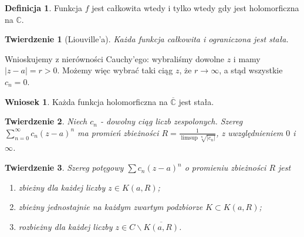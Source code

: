 \documentclass[11pt]{article}
\newcommand{\abs}[1]{\left|#1\right|} %
\newcommand{\closure}[1]{\overline{#1}} %
\newcommand{\extcomplex}{\overline{\mathbb{C}}} %
\theoremstyle{plain}
\newtheorem*{theorem}{Twierdzenie}
\theoremstyle{definition}
\newtheorem*{definition}{Definicja}
\newtheorem*{corollary}{Wniosek}
\theoremstyle{remark}
\let\oldendproof\endproof
\renewenvironment{proof}[1][\proofname]{
  \oldproof[\textsc{\small #1}]
}{\oldendproof}
\begin{document}
\begin{definition}
  Funkcja $ f $ jest całkowita wtedy i tylko wtedy gdy jest holomorficzna na $ \mathbb{C} $.
\end{definition}

\begin{theorem}[Liouville'a]
  Każda funkcja całkowita i ograniczona jest stała.
\end{theorem}

\begin{proof}
  Wnioskujemy z nierówności Cauchy'ego: wybraliśmy dowolne $ z $ i mamy $ \abs{z-a} = r > 0 $. Możemy więc wybrać taki ciąg $ z $, że $ r \to \infty $, a stąd wszystkie $ c_{n} = 0 $. 
\end{proof}

\begin{corollary}
  Każda funkcja holomorficzna na $ \extcomplex $ jest stała.
\end{corollary}

\begin{theorem}
  Niech $ c_{n} $ - dowolny ciąg liczb zespolonych. Szereg $ \sum_{n=0}^{\infty} c_{n}(z-a)^{n} $ ma promień zbieżności $ R = \frac{1}{\limsup \sqrt[n]{\abs{c_{n}}}} $, z uwzględnieniem $ 0 $ i $ \infty $.
\end{theorem}

\begin{theorem}
  Szereg potęgowy $ \sum c_{n}(z-a)^{n} $ o promieniu zbieżności $ R $ jest 
  \begin{enumerate}
    \item zbieżny dla każdej liczby $ z \in K(a, R) $; \label{prom-zbieznosci-zbieznosc}
    \item zbieżny jednostajnie na każdym zwartym podzbiorze $ K \subset K(a, R) $; \label{prom-zbieznosci-zbieznosc-jedn}
    \item rozbieżny dla każdej liczby $ z \in C \backslash \closure{K(a, R)} $. \label{prom-zbieznosci-rozbieznosc}
  \end{enumerate}
\end{theorem}
\end{document}
